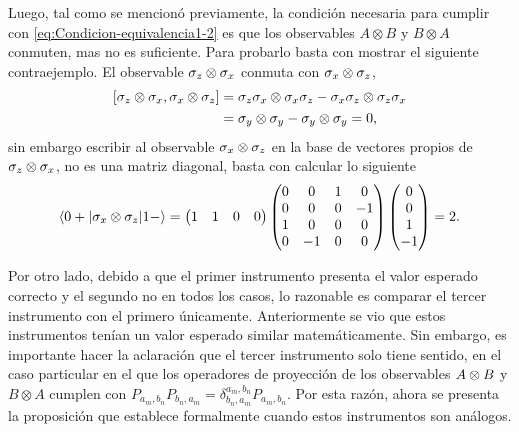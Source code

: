 Luego, tal como se mencionó previamente, la condición necesaria para cumplir con {\eqref{eq:Condicion-equivalencia1-2}} es que los observables $A\otimes B$ y $B\otimes A$ conmuten, mas no es suficiente. Para probarlo basta con mostrar el siguiente contraejemplo. El observable $\sigma_z\otimes \sigma_x$ conmuta con $\sigma_x \otimes \sigma_z$,\[\begin{split}[\sigma_z\otimes \sigma_x,\sigma_x \otimes \sigma_z]&=\sigma_z \sigma_x \otimes \sigma_x \sigma_z- \sigma_x\sigma_z \otimes \sigma_z\sigma_x\\
&=\sigma_y\otimes \sigma_y -\sigma_y\otimes \sigma_y =0,
\end{split}\]sin embargo escribir al observable $\sigma_x\otimes \sigma_z $ en la base de vectores propios de $\sigma_z\otimes \sigma_x$, no es una matriz diagonal, basta con calcular lo siguiente \[\begin{split}
    \langle 0+|\sigma_x\otimes \sigma_z|1-\rangle&=\begin{pmatrix}
        1&1&0&0
    \end{pmatrix}\begin{pmatrix}
        0&0&1&0\\
        0&0&0&-1\\
        1&0&0&0\\
        0&-1&0&0\\
    \end{pmatrix}\begin{pmatrix}
         0\\
         0\\
         1\\
        -1\\
    \end{pmatrix}=2.\\
\end{split}\]


Por otro lado, debido a que el primer instrumento presenta el valor esperado
correcto y el segundo no en todos los casos, lo razonable es comparar el tercer
instrumento con el primero únicamente. Anteriormente se vio que estos
instrumentos tenían un valor esperado similar matemáticamente. Sin embargo, es
importante hacer la aclaración que el tercer instrumento solo tiene sentido, en
el caso particular en el que los operadores de proyección de los observables
$A\otimes B$ y $B\otimes A$ cumplen con
$P_{a_m,b_n}P_{b_n,a_m}=\delta_{b_n,a_m}^{a_m,b_n}P_{a_m,b_n}$. Por esta razón,
ahora se presenta la proposición que establece formalmente cuando estos
instrumentos son análogos.

